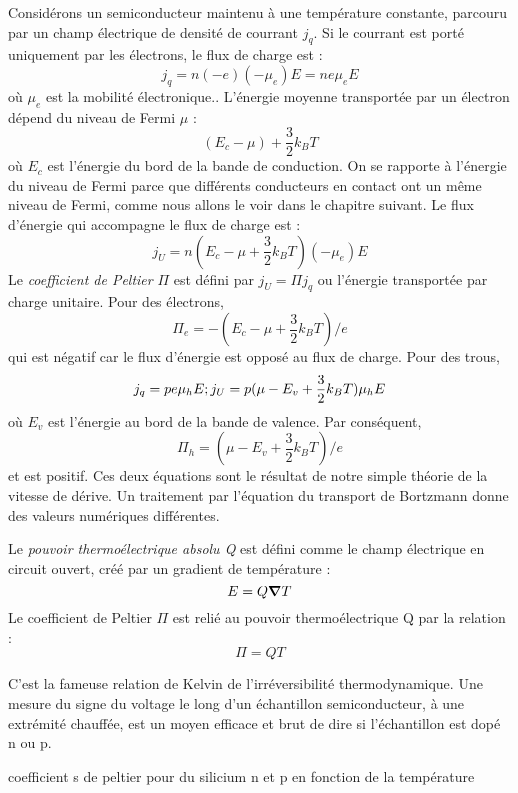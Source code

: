 Considérons un semiconducteur maintenu à une température constante, parcouru par
un champ électrique de densité de courrant $j_q$. Si le courrant est porté
uniquement par les électrons, le flux de charge est :
\begin{equation}
    j_q = n(-e)(-\mu_e)E = ne\mu_e E
\end{equation}
où $\mu_e$ est la mobilité électronique.. L'énergie moyenne transportée par un
électron dépend du niveau de Fermi $\mu$ :
\begin{equation*}
    (E_c - \mu) + \frac{3}{2}k_BT
\end{equation*}
où $E_c$ est l'énergie du bord de la bande de conduction. On se rapporte à
l'énergie du niveau de Fermi parce que différents conducteurs en contact ont un
même niveau de Fermi, comme nous allons le voir dans le chapitre suivant. Le flux
d'énergie qui accompagne le flux de charge est :
\begin{equation}
    j_U = n(E_c - \mu +\frac{3}{2}k_BT)(-\mu_e)E
\end{equation}
Le \emph{coefficient de Peltier} $\Pi$ est défini par $j_U = \Pi j_q$ ou
l'énergie transportée par charge unitaire. Pour des électrons,
\begin{equation}
    \Pi_e = -(E_c - \mu + \frac{3}{2}k_BT)/e
\end{equation}
qui est négatif car le flux d'énergie est opposé au flux de charge. Pour des
trous,
\begin{equation}
    j_q = pe\mu_hE; \hfill j_U = p(\mu - E_v + \frac{3}{2}k_BT)\mu_h E
\end{equation}
où $E_v$ est l'énergie au bord de la bande de valence. Par conséquent,
\begin{equation}
    \Pi_h = (\mu - E_v + \frac{3}{2}k_BT)/e
\end{equation}
et est positif. Ces deux équations sont le résultat de notre simple théorie de la
vitesse de dérive. Un traitement par l'équation du transport de Bortzmann donne
des valeurs numériques différentes.

Le \emph{pouvoir thermoélectrique absolu Q} est défini comme le champ électrique
en circuit ouvert, créé par un gradient de température :
\begin{equation}
    E = Q \mbox{\boldmath$ \nabla $} T
\end{equation}
Le coefficient de Peltier $\Pi$ est relié au pouvoir thermoélectrique Q par la
relation :
\begin{equation}
    \Pi = QT
\end{equation}

C'est la fameuse relation de Kelvin de l'irréversibilité thermodynamique. Une
mesure du signe du voltage le long d'un échantillon semiconducteur, à une
extrémité chauffée, est un moyen efficace et brut de dire si l'échantillon est
dopé n ou p.

\begin{marginfigure}
    \TODO
    \caption{coefficient s de peltier pour du silicium n et p en fonction de la
    température}
    \label{peltier}
\end{marginfigure}
